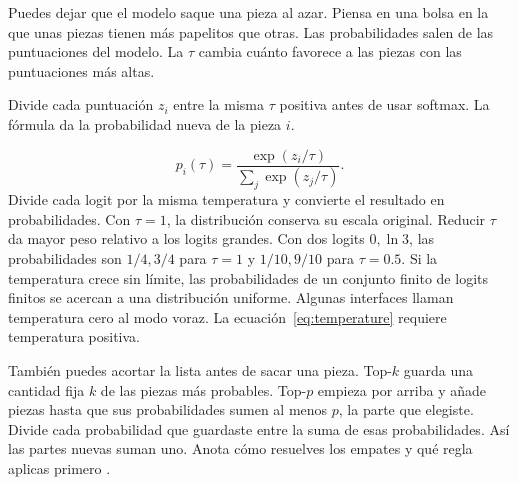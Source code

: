 {Puedes dejar que el modelo saque una pieza al azar. Piensa en una bolsa en la que unas piezas tienen más papelitos que otras. Las probabilidades salen de las puntuaciones del modelo. La  \(\tau\) cambia cuánto favorece a las piezas con las puntuaciones más altas.

\moremath
Divide cada puntuación \(z_i\) entre la misma \(\tau\) positiva antes de usar softmax. La fórmula da la probabilidad nueva de la pieza \(i\).}
\begin{equation}
 p_i(\tau)=\frac{\exp(z_i/\tau)}{\sum_j\exp(z_j/\tau)} .
 \label{eq:temperature}
\end{equation}
{Divide cada logit por la misma temperatura y convierte el resultado en probabilidades. Con \(\tau=1\), la distribución conserva su escala original. Reducir \(\tau\) da mayor peso relativo a los logits grandes. Con dos logits \(0,\ln 3\), las probabilidades son \(1/4,3/4\) para \(\tau=1\) y \(1/10,9/10\) para \(\tau=0.5\). Si la temperatura crece sin límite, las probabilidades de un conjunto finito de logits finitos se acercan a una distribución uniforme. Algunas interfaces llaman temperatura cero al modo voraz. La ecuación~\eqref{eq:temperature} requiere temperatura positiva.}

{También puedes acortar la lista antes de sacar una pieza. Top-\(k\) guarda una cantidad fija \(k\) de las piezas más probables. Top-\(p\) empieza por arriba y añade piezas hasta que sus probabilidades sumen al menos \(p\), la parte que elegiste. Divide cada probabilidad que guardaste entre la suma de esas probabilidades. Así las partes nuevas suman uno. Anota cómo resuelves los empates y qué regla aplicas primero \citep{nucleus}.}


